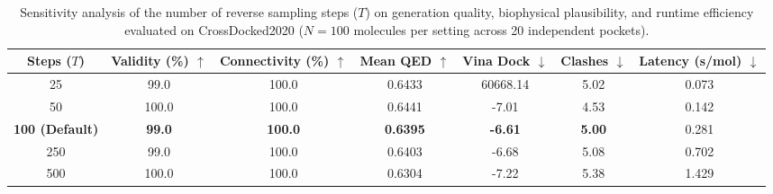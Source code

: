 
\begin{table}[t]
\centering
\small
\caption{Sensitivity analysis of the number of reverse sampling steps ($T$) on generation quality, biophysical plausibility, and runtime efficiency evaluated on CrossDocked2020 ($N=100$ molecules per setting across 20 independent pockets).}
\label{tab:sensitivity_sampling_steps}
\begin{tabular}{ccccccc}
\toprule
\textbf{Steps ($T$)} & \textbf{Validity (\%)} $\uparrow$ & \textbf{Connectivity (\%)} $\uparrow$ & \textbf{Mean QED} $\uparrow$ & \textbf{Vina Dock} $\downarrow$ & \textbf{Clashes} $\downarrow$ & \textbf{Latency (s/mol)} $\downarrow$ \\
\midrule
25 & 99.0 & 100.0 & 0.6433 & 60668.14 & 5.02 & 0.073 \\
50 & 100.0 & 100.0 & 0.6441 & -7.01 & 4.53 & 0.142 \\
\textbf{100 (Default)} & \textbf{99.0} & \textbf{100.0} & \textbf{0.6395} & \textbf{-6.61} & \textbf{5.00} & 0.281 \\
250 & 99.0 & 100.0 & 0.6403 & -6.68 & 5.08 & 0.702 \\
500 & 100.0 & 100.0 & 0.6304 & -7.22 & 5.38 & 1.429 \\
\bottomrule
\end{tabular}
\end{table}
